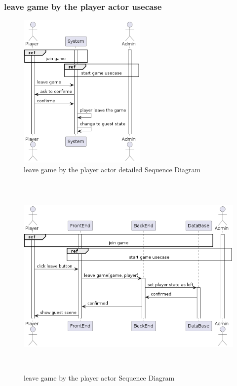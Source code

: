 \documentclass{article}
\begin{document}
\subsubsection{leave game by the player actor usecase}
\begin{figure}[H]
	\centering
	\includegraphics[height=3in]{../thesis_tex/assets/diagrams/player_leave_game_SD.png}
	\caption{leave game by the player actor detailed Sequence Diagram}
\end{figure}

\begin{figure}[H]
	\centering
	\includegraphics[height=4in,width=6in]{../thesis_tex/assets/diagrams/player_leave_game_detailedSD.png}
	\caption{leave game by the player actor Sequence Diagram}
\end{figure}
\end{document}
